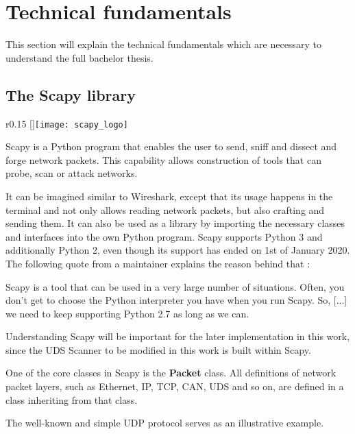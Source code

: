 \section{Technical fundamentals}

This section will explain the technical fundamentals which are necessary to understand the full bachelor thesis.

\subsection{The Scapy library}

\begin{wrapfigure}{r}{0.15\textwidth}
    \raisebox{0pt}[\dimexpr{}\baselineskip\relax]{\texttt{[image: scapy\_logo]}}
\end{wrapfigure}

Scapy \cite{scapy} is a Python program that enables the user to send, sniff and dissect and forge network packets. This capability allows construction of tools that can probe, scan or attack networks.

It can be imagined similar to Wireshark, except that its usage happens in the terminal and not only allows reading network packets, but also crafting and sending them. It can also be used as a library by importing the necessary classes and interfaces into the own Python program. Scapy supports Python 3 and additionally Python 2, even though its support has ended on 1st of January 2020. The following quote from a maintainer explains the reason behind that \cite{scapy-py2}:

\begin{displayquote}
    Scapy is a tool that can be used in a very large number of situations. Often, you don't get to choose the Python interpreter you have when you run Scapy. So, [...] we need to keep supporting Python 2.7 as long as we can.
\end{displayquote}

Understanding Scapy will be important for the later implementation in this work, since the UDS Scanner to be modified in this work is built within Scapy.

One of the core classes in Scapy is the \textbf{Packet} class. All definitions of network packet layers, such as Ethernet, IP, TCP, CAN, UDS and so on, are defined in a class inheriting from that class.

The well-known and simple UDP protocol \cite{udp} serves as an illustrative example.

